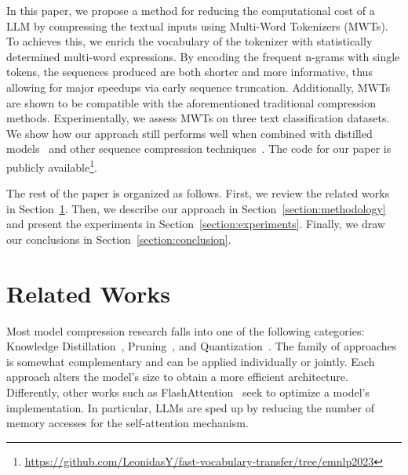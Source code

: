 \documentclass[11pt]{article}
\newcommand{\az}[1]{\color{black} #1}
\begin{document}

In this paper, we propose a method for reducing the computational cost of a LLM by compressing the textual inputs using Multi-Word Tokenizers (MWTs). {\az To achieves this, we enrich the vocabulary of the tokenizer with statistically determined multi-word expressions. By encoding the frequent n-grams with single tokens, the sequences produced are both shorter and more informative}, thus allowing for major speedups via early sequence truncation. Additionally, MWTs are shown to be compatible with the aforementioned traditional compression methods. Experimentally, {\az we assess MWTs on three text classification datasets. We show how our approach still performs well when combined with distilled models~\citep{DistilBERT} and other sequence compression techniques~\citep{FVT}.} The code for our paper is publicly available\footnote{\url{https://github.com/LeonidasY/fast-vocabulary-transfer/tree/emnlp2023}}.

The rest of the paper is organized as follows. First, we review the related works in Section~\ref{section:relworks}. Then, we describe our approach in Section~\ref{section:methodology} and present the experiments in Section~\ref{section:experiments}. Finally, we draw our conclusions in Section~\ref{section:conclusion}.



\section{Related Works}\label{section:relworks}
Most model compression research falls into one of the following categories: Knowledge Distillation~\citep{Distillation, DistilBERT, TinyBERT, MiniLM, MobileBERT}, Pruning~\citep{Prune, 16Heads}, and Quantization~\citep{QBERT}. The family of approaches is somewhat complementary and can be applied individually or jointly. Each approach alters the model's size to obtain a more efficient architecture. {\az Differently, other works such as FlashAttention~\citep{dao2022flashattention} seek to optimize a model's implementation. In particular, LLMs are sped up by reducing the number of memory accesses for the self-attention mechanism.}
\end{document}
